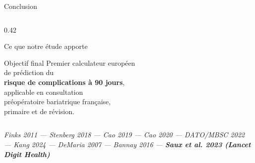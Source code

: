 \documentclass[aspectratio=169]{beamer}
\begin{document}
\begin{frame}{Conclusion}
\begin{columns}[T]
\begin{column}{0.42\textwidth}
\begin{alertblock}{Ce que notre étude apporte}
\begin{itemize}
        \end{itemize}
      \end{alertblock}
      \vspace{0.3em}
      \begin{exampleblock}{Objectif final}
        \footnotesize
        Premier calculateur européen\\
        de prédiction du\\
        \textbf{risque de complications à 90 jours},\\
        applicable en consultation\\
        préopératoire bariatrique française,\\
        primaire et de révision.
      \end{exampleblock}
    \end{column}
  \end{columns}
  \vspace{0.2em}
  \begin{center}
    \tiny\textit{Finks 2011 --- Stenberg 2018 --- Cao 2019 --- Cao 2020 ---
    DATO/MBSC 2022 --- Kang 2024 --- DeMaria 2007 ---
    Bannay 2016 --- \textbf{Saux et al. 2023 (Lancet Digit Health)}}
  \end{center}
\end{frame}
\end{document}
